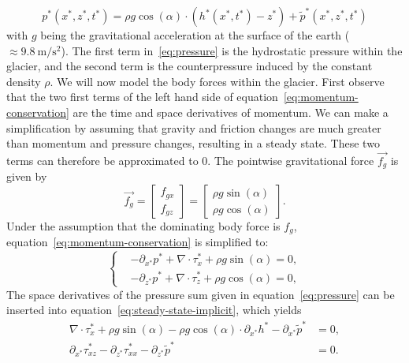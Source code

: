 %
\begin{equation} \label{eq:pressure}
  p^*(x^*, z^*, t^*) = \rho g \cos(\alpha) \cdot (h^*(x^*, t^*) - z^*) + \tilde{p}^*(x^*, z^*, t^*)
\end{equation}
%
with $g$ being the gravitational acceleration at the surface of the earth ($\approx \SI{9.8}{\meter\per\square\second}$). The first term in~\eqref{eq:pressure} is the hydrostatic pressure within the glacier, and the second term is the counterpressure induced by the constant density $\rho$.
%
We will now model the body forces within the glacier. First observe that the two first terms of the left hand side of equation~\eqref{eq:momentum-conservation} are the time and space derivatives of momentum.
We can make a simplification by assuming that gravity and friction changes are much greater than momentum and pressure changes, resulting in a steady state. These two terms can therefore be approximated to $0$. The pointwise gravitational force $\vec{f_g}$ is given by
%
\begin{equation}
  \vec{f_g} = \begin{bmatrix} f_{gx} \\ f_{gz} \end{bmatrix} = \begin{bmatrix} \rho g \sin(\alpha) \\ \rho g \cos(\alpha) \end{bmatrix}.
\end{equation}
%
Under the assumption that the dominating body force is $f_g$, equation~\eqref{eq:momentum-conservation} is simplified  to:
%
\begin{equation} \label{eq:steady-state-implicit}
  \begin{cases}
    &-\partial_{x^*} p^* + \nabla \cdot \tau_x^* + \rho g \sin(\alpha) = 0, \\
    &-\partial_{z^*} p^* + \nabla \cdot \tau_z^* + \rho g \cos(\alpha) = 0,
  \end{cases}
\end{equation}
%
The space derivatives of the pressure sum given in equation~\eqref{eq:pressure} can be inserted into equation~\eqref{eq:steady-state-implicit}, which yields
%
\begin{equation} \label{eq:steady-state-explicit}
  \begin{split}
    \nabla \cdot \tau_x^* + \rho g \sin(\alpha) - \rho g \cos(\alpha) \cdot \partial_{x^*} h^* - \partial_{x^*} \tilde{p}^* &= 0, \\
    \partial_{x^*} \tau_{xz}^* - \partial_{z^*} \tau_{xx}^* - \partial_{z^*} \tilde{p}^* &= 0.
  \end{split}
\end{equation}
